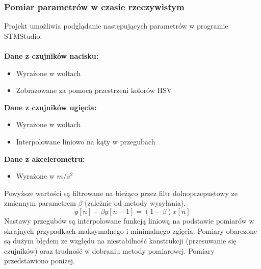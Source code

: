 \documentclass[12pt,a4paper]{article}
\begin{document}
\subsubsection{Pomiar parametrów w czasie rzeczywistym}
Projekt umożliwia podglądanie następujących parametrów w programie STMStudio:\\\\
\textbf{Dane z czujników nacisku:}
\begin{itemize}
\item Wyrażone w woltach
\item Zobrazowane za pomocą przestrzeni kolorów HSV
\end{itemize}
\textbf{Dane z czujników ugięcia:}
\begin{itemize}
\item Wyrażone w woltach
\item Interpolowane liniowo na kąty w przegubach
\end{itemize}
\textbf{Dane z akcelerometru:}
\begin{itemize}
\item Wyrażone w $m/s^2$
\end{itemize}
Powyższe wartości są filtrowane na bieżąco przez filtr dolnoprzepustowy ze zmiennym parametrem $\beta$ (zależnie od metody wysyłania).
\begin{equation} \label{eq:1}
y[n] - \beta y[n-1] = (1-\beta)x[n]
\end{equation}
Nastawy przegubów są interpolowane funkcją liniową na podstawie pomiarów w skrajnych przypadkach maksymalnego i minimalnego zgięcia. Pomiary obarczone są dużym błędem ze względu na niestabilność konstrukcji (przesuwanie się czujników) oraz trudność w dobraniu metody pomiarowej. Pomiary przedstawiono poniżej.
\end{document}
